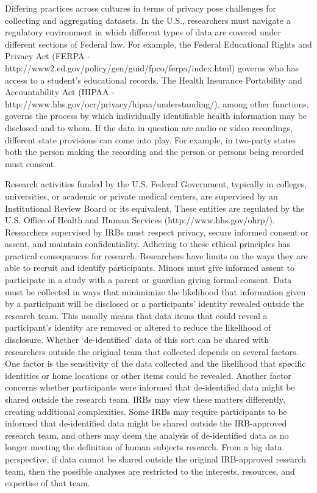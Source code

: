 \documentclass[letterpaper,man,apacite]{apa6}
\begin{document}
Differing practices across cultures in terms of privacy pose challenges for collecting and aggregating datasets.
In the U.S., researchers must navigate a regulatory environment in which different types of data are covered under different sections of Federal law.
For example, the Federal Educational Rights and Privacy Act (FERPA - http://www2.ed.gov/policy/gen/guid/fpco/ferpa/index.html) governs who has access to a student's educational records.
The Health Insurance Portability and Accountability Act (HIPAA - http://www.hhs.gov/ocr/privacy/hipaa/understanding/), among other functions, governs the process by which individually identifiable health information may be disclosed and to whom.
If the data in question are audio or video recordings, different state provisions can come into play.
For example, in two-party states \cite{http://www.dmlp.org/legal-guide/recording-phone-calls-and-conversations} both the person making the recording and the person or persons being recorded must consent.

Research activities funded by the U.S. Federal Government, typically in colleges, universities, or academic or private medical centers, are supervised by an Institutional Review Board or its equivalent.
These entities are regulated by the U.S. Office of Health and Human Services (http://www.hhs.gov/ohrp/).
Researchers supervised by IRBs must respect privacy, secure informed consent or assent, and maintain confidentiality. 
Adhering to these ethical principles has practical consequences for research.
Researchers have limits on the ways they are able to recruit and identify participants.
Minors must give informed assent to participate in a study with a parent or guardian giving formal consent.
Data must be collected in ways that minimimize the likelihood that information given by a participant will be disclosed or a participants' identity revealed outside the research team.
This usually means that data items that could reveal a participant's identity are removed or altered to reduce the likelihood of disclosure.
Whether `de-identified' data of this sort can be shared with researchers outside the original team that collected depends on several factors.
One factor is the sensitivity of the data collected and the likelihood that specific identities or home locations or other items could be revealed.
Another factor concerns whether participants were informed that de-identified data might be shared outside the research team.
IRBs may view these matters differently, creating additional complexities.
Some IRBs may require participants to be informed that de-identified data might be shared outside the IRB-approved research team, and others may deem the analysis of de-identified data as no longer meeting the definition of human subjects research.
From a big data perspective, if data cannot be shared outside the original IRB-approved research team, then the possible analyses are restricted to the interests, resources, and expertise of that team.
\end{document}
